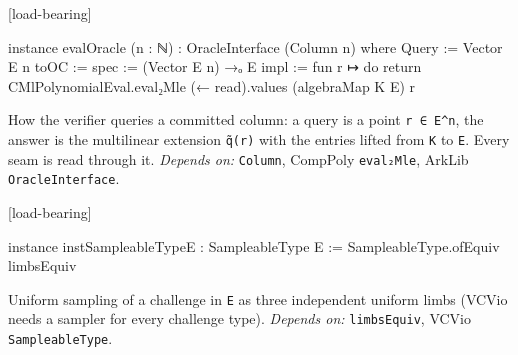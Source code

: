 \par\medskip\noindent\textbf{}\hfill\textsf{\small [load-bearing]}\par\nopagebreak

\begin{leancode}
instance evalOracle (n : ℕ) : OracleInterface (Column n) where
  Query := Vector E n
  toOC :=
    { spec := (Vector E n) →ₒ E
      impl := fun r ↦ do return CMlPolynomialEval.eval₂Mle (← read).values (algebraMap K E) r }
\end{leancode}


How the verifier queries a committed column: a query is a point \texttt{r ∈ E\textasciicircum{}n}, the answer is the multilinear extension \texttt{q̃(\allowbreak{}r)} with the entries lifted from \texttt{K} to \texttt{E}. Every seam is read through it. \emph{Depends on:} \texttt{Column}, CompPoly \texttt{eval₂Mle}, ArkLib \texttt{OracleInterface}.

\par\medskip\noindent\textbf{}\hfill\textsf{\small [load-bearing]}\par\nopagebreak

\begin{leancode}
instance instSampleableTypeE : SampleableType E := SampleableType.ofEquiv limbsEquiv
\end{leancode}


Uniform sampling of a challenge in \texttt{E} as three independent uniform limbs (VCVio needs a sampler for every challenge type). \emph{Depends on:} \texttt{limbsEquiv}, VCVio \texttt{SampleableType}.
